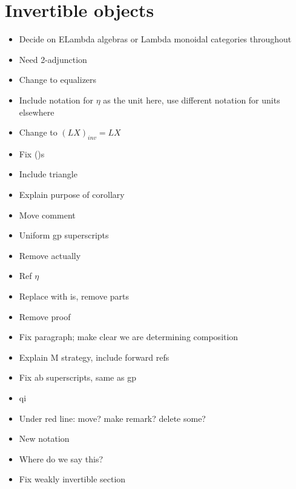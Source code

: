 \documentclass{amsart}
\begin{document}
\section{ Invertible objects}
\begin{itemize}
\item Decide on ELambda algebras or Lambda monoidal categories throughout
\item Need 2-adjunction
\item Change to equalizers
\item Include notation for $\eta$ as the unit here, use different notation for units elsewhere
\item Change to $(LX)_{inv} = LX$
\item Fix ()s
\item Include triangle
\item Explain purpose of corollary
\item Move comment
\item Uniform gp superscripts
\item Remove actually
\item Ref $\eta$
\item Replace with is, remove parts
\item Remove proof
\item Fix paragraph; make clear we are determining composition
\item Explain M strategy, include forward refs
\item Fix ab superscripts, same as gp
\item qi
\item Under red line: move? make remark? delete some?
\item New notation
\item Where do we say this?
\item Fix weakly invertible section
\end{itemize}
\end{document}
